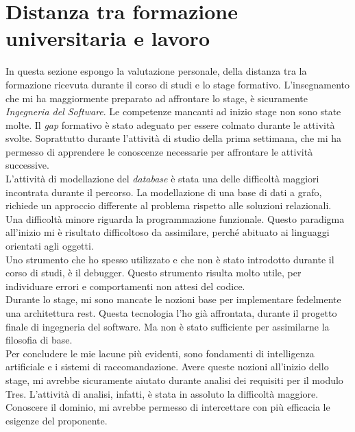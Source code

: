 \section{Distanza tra formazione universitaria e lavoro}
In questa sezione espongo la valutazione personale, della distanza tra la formazione ricevuta durante il corso di studi e lo stage formativo. 
L'insegnamento che mi ha maggiormente preparato ad affrontare lo stage, è sicuramente \emph{Ingegneria del Software}.
Le competenze mancanti ad inizio stage non sono state molte.
Il \emph{gap} formativo è stato adeguato per essere colmato durante le attività svolte. Soprattutto durante l'attività di studio della prima settimana, che mi ha permesso di apprendere le conoscenze necessarie per affrontare le attività successive.\\
L'attività di modellazione del \emph{database} è stata una delle difficoltà maggiori incontrata durante il percorso. La modellazione di una base di dati a grafo, richiede un approccio differente al problema rispetto alle soluzioni relazionali.\\
Una difficoltà minore riguarda la programmazione funzionale. Questo paradigma all'inizio mi è risultato difficoltoso da assimilare, perché abituato ai linguaggi orientati agli oggetti.\\
Uno strumento che ho spesso utilizzato e che non è stato introdotto durante il corso di studi, è il debugger. Questo strumento risulta molto utile, per individuare errori e comportamenti non attesi del codice.\\
Durante lo stage, mi sono mancate le nozioni base per implementare fedelmente una architettura \gls{rest}. Questa tecnologia l'ho già affrontata, durante il progetto finale di ingegneria del software. Ma non è stato sufficiente per assimilarne la filosofia di base.\\
Per concludere le mie lacune più evidenti, sono fondamenti di intelligenza artificiale e i sistemi di raccomandazione. Avere queste nozioni all'inizio dello stage, mi avrebbe sicuramente aiutato durante analisi dei requisiti per il modulo Tres. L'attività di analisi, infatti, è stata in assoluto la difficoltà maggiore. Conoscere il dominio, mi avrebbe permesso di intercettare con più efficacia le esigenze del proponente.


